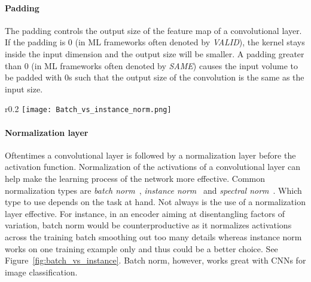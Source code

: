 \documentclass[a4paper,12pt]{report}
\begin{document}
\paragraph{Padding					} The padding controls the output size of the feature map of a convolutional layer. If the padding is 0 (in ML frameworks often denoted by \textit{VALID}), the kernel stays inside the input dimension and the output size will be smaller. A padding greater than 0 (in ML frameworks often denoted by \textit{SAME}) causes the input volume to be padded with 0s such that the output size of the convolution is the same as the input size.

\begin{wrapfigure}{r}{0.2\textwidth}
\texttt{[image: Batch\_vs\_instance\_norm.png]}
\caption{Batch vs. instance norm \cite{GroupNorm}. $N$ is the batch size.}
\label{fig:batch_vs_instance}
\end{wrapfigure}
\paragraph{Normalization layer      } Oftentimes a convolutional layer is followed by a normalization layer before the activation function. Normalization of the activations of a convolutional layer can help make the learning process of the network more effective. Common normalization types are \textit{batch norm}~\cite{BatchNorm}, \textit{instance norm}~\cite{InstanceNorm} and \textit{spectral norm}~\cite{SNGAN}. Which type to use depends on the task at hand. Not always is the use of a normalization layer effective. For instance, in an encoder aiming at disentangling factors of variation, batch norm would be counterproductive as it normalizes activations across the training batch smoothing out too many details whereas instance norm works on one training example only and thus could be a better choice. See Figure~\ref{fig:batch_vs_instance}. Batch norm, however, works great with CNNs for image classification.
\end{document}

